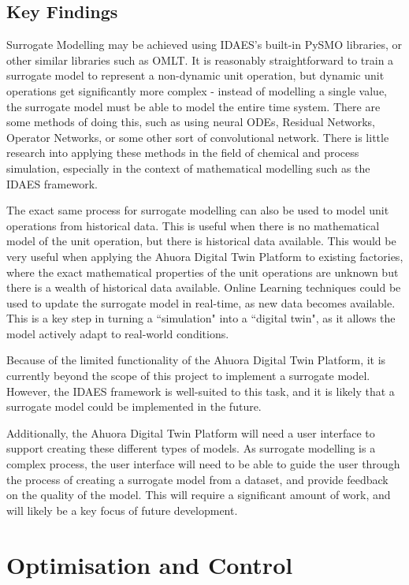 \documentclass[12pt]{report}
\begin{document}
\subsection{Key Findings}\label{sec:surrogatemodelling}

Surrogate Modelling may be achieved using IDAES's built-in PySMO libraries, or other similar libraries such as OMLT. It is reasonably straightforward to train a surrogate model to represent a non-dynamic unit operation, but dynamic unit operations get significantly more complex - instead of modelling a single value, the surrogate model must be able to model the entire time system. There are some methods of doing this, such as using neural ODEs, Residual Networks, Operator Networks, or some other sort of convolutional network. There is little research into applying these methods in the field of chemical and process simulation, especially in the context of mathematical modelling such as the IDAES framework.

The exact same process for surrogate modelling can also be used to model unit operations from historical data. This is useful when there is no mathematical model of the unit operation, but there is historical data available. This would be very useful when applying the Ahuora Digital Twin Platform to existing factories, where the exact mathematical properties of the unit operations are unknown but there is a wealth of historical data available. Online Learning techniques could be used to update the surrogate model in real-time, as new data becomes available. This is a key step in turning a ``simulation" into a ``digital twin", as it allows the model actively adapt to real-world conditions.

Because of the limited functionality of the Ahuora Digital Twin Platform, it is currently beyond the scope of this project to implement a surrogate model. However, the IDAES framework is well-suited to this task, and it is likely that a surrogate model could be implemented in the future.

Additionally, the Ahuora Digital Twin Platform will need a user interface to support creating these different types of models. As surrogate modelling is a complex process, the user interface will need to be able to guide the user through the process of creating a surrogate model from a dataset, and provide feedback on the quality of the model. This will require a significant amount of work, and will likely be a key focus of future development.


\section{Optimisation and Control}
\end{document}
